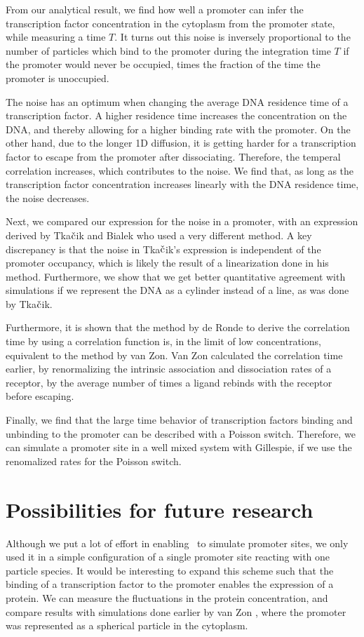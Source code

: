 From our analytical result, we find how well a promoter can infer the transcription factor concentration in the cytoplasm from the promoter state, while measuring a time $T$. It turns out this noise is inversely proportional to the number of particles which bind to the promoter during the integration time $T$ if the promoter would never be occupied, times the fraction of the time the promoter is unoccupied.

The noise has an optimum when changing the average DNA residence time of a transcription factor. A higher residence time increases the concentration on the DNA, and thereby allowing for a higher binding rate with the promoter. On the other hand, due to the longer 1D diffusion, it is getting harder for a transcription factor to escape from the promoter after dissociating. Therefore, the temperal correlation increases, which contributes to the noise. We find that, as long as the transcription factor concentration increases linearly with the DNA residence time, the noise decreases.

Next, we compared our expression for the noise in a promoter, with an expression derived by Tka$\check{\rm c}$ik and Bialek who used a very different method. A key discrepancy is that the noise in Tka$\check{\rm c}$ik's expression is independent of the promoter occupancy, which is likely the result of a linearization done in his method. Furthermore, we show that we get better quantitative agreement with simulations if we represent the DNA as a cylinder instead of a line, as was done by Tka$\check{\rm c}$ik.

Furthermore, it is shown that the method by de Ronde to derive the correlation time by using a correlation function is, in the limit of low concentrations, equivalent to the method by van Zon. Van Zon calculated the correlation time earlier, by renormalizing the intrinsic association and dissociation rates of a receptor, by the average number of times a ligand rebinds with the receptor before escaping.

Finally, we find that the large time behavior of transcription factors binding and unbinding to the promoter can be described with a Poisson switch. Therefore, we can simulate a promoter site in a well mixed system with Gillespie, if we use the renomalized rates for the Poisson switch.

\newpage

\section{Possibilities for future research}
Although we put a lot of effort in enabling \GFRD\, to simulate promoter sites, we only used it in a simple configuration of a single promoter site reacting with one particle species. It would be interesting to expand this scheme such that the binding of a transcription factor to the promoter enables the expression of a protein. We can measure the fluctuations in the protein concentration, and compare results with simulations done earlier by van Zon \cite{VanZon2006}, where the promoter was represented as a spherical particle in the cytoplasm. 

